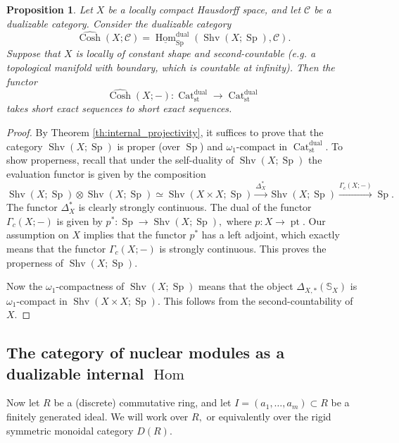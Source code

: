 \documentclass[11pt,leqno]{amsart}
\newtheorem{prop}[theo]{Proposition}
\numberwithin{equation}{section}
\def\bS{\mathbb{S}}
\def\Hom{\operatorname{Hom}}
\newcommand{\hhat}{\widehat}
\newcommand{\xto}{\xrightarrow}
\newcommand{\Cat}{\operatorname{Cat}}
\newcommand{\st}{\operatorname{st}}
\newcommand{\dual}{\operatorname{dual}}
\newcommand{\cC}{{\mathcal C}}
\newcommand{\un}{\underline}
\newcommand{\Cosh}{\operatorname{Cosh}}
\newcommand{\Shv}{\operatorname{Shv}}
\newcommand{\Sp}{\operatorname{Sp}}
\newcommand{\pt}{\operatorname{pt}}
\begin{document}
\begin{prop}Let $X$ be a locally compact Hausdorff space, and let $\cC$ be a dualizable category. Consider the dualizable category
\begin{equation*}
\hhat{\Cosh}(X;\cC)=\un{\Hom}_{\Sp}^{\dual}(\Shv(X;\Sp),\cC).
\end{equation*}
Suppose that $X$ is locally of constant shape and second-countable (e.g. a topological manifold with boundary, which is countable at infinity). Then the functor
\begin{equation*}
\hhat{\Cosh}(X;-):\Cat_{\st}^{\dual}\to\Cat_{\st}^{\dual}	
\end{equation*}
takes short exact sequences to short exact sequences.\end{prop}

\begin{proof}
By Theorem \ref{th:internal_projectivity}, it suffices to prove that the category $\Shv(X;\Sp)$ is proper (over $\Sp$)  and $\omega_1$-compact in $\Cat_{\st}^{\dual}.$
To show properness, recall that under the self-duality of $\Shv(X;\Sp)$ the evaluation functor is given by the composition
\begin{equation*}
\Shv(X;\Sp)\otimes\Shv(X;\Sp)\simeq \Shv(X\times X;\Sp)\xto{\Delta_X^*}\Shv(X;\Sp)\xto{\Gamma_c(X;-)}\Sp.
\end{equation*}
The functor $\Delta_X^*$ is clearly strongly continuous. The dual of the functor $\Gamma_c(X;-)$ is given by $p^*:\Sp\to\Shv(X;\Sp),$ where $p:X\to\pt.$ Our assumption on $X$ implies that the functor $p^*$ has a left adjoint, which exactly means that the functor $\Gamma_c(X;-)$ is strongly continuous. This proves the properness of $\Shv(X;\Sp).$

Now the $\omega_1$-compactness of $\Shv(X;\Sp)$ means that the object $\Delta_{X,*}(\bS_X)$ is $\omega_1$-compact in $\Shv(X\times X;\Sp).$ This follows from the second-countability of $X.$
\end{proof}

\subsection{The category of nuclear modules as a dualizable internal $\Hom$}
\label{ssec:Nuc_as_Hom^dual}

Now let $R$ be a (discrete) commutative ring, and let $I=(a_1,\dots,a_m)\subset R$ be a finitely generated ideal. We will work over $R,$ or equivalently over the rigid symmetric monoidal category $D(R).$ 
\end{document}
